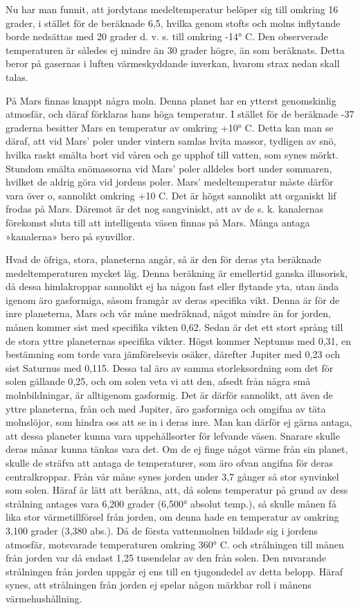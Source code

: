\documentclass[a4paper, 12pt, oneside, swedish]{article}
\begin{document}
Nu har man funnit, att jordytans medeltemperatur belöper sig till omkring 16 grader, i stället för de beräknade 6,5, hvilka genom stofts och molns inflytande borde nedsättas med 20 grader d. v. s. till omkring -14° C. Den observerade temperaturen är således ej mindre än 30 grader högre, än som beräknats. Detta beror på gasernas i luften värmeskyddande inverkan, hvarom strax nedan skall talas.

På Mars finnas knappt några moln. Denna planet har en ytterst genomskinlig atmosfär, och däraf förklaras hans höga temperatur. I stället för de beräknade -37 graderna besitter Mars en temperatur av omkring +10° C. Detta kan man se däraf, att vid Mars' poler under vintern samlas hvita massor, tydligen av snö, hvilka raskt smälta bort vid våren och ge upphof till vatten, som synes mörkt. Stundom smälta snömassorna vid Mars' poler alldeles bort under sommaren, hvilket de aldrig göra vid jordens poler. Mars' medeltemperatur måste därför vara över o, sannolikt omkring +10 C. Det är högst sannolikt att organiskt lif frodas på Mars. Däremot är det nog sangviniskt, att av de s. k. kanalernas förekomst sluta till att intelligenta väsen finnas på Mars. Många antaga »kanalerna» bero på synvillor.

Hvad de öfriga, stora, planeterna angår, så är den för deras yta beräknade medeltemperaturen mycket låg. Denna beräkning är emellertid ganska illusorisk, då dessa himlakroppar sannolikt ej ha någon fast eller flytande yta, utan ända igenom äro gasformiga, såsom framgår av deras specifika vikt. Denna är för de inre planeterna, Mars och vår måne medräknad, något mindre än for jorden, månen kommer sist med specifika vikten 0,62. Sedan är det ett stort språng till de stora yttre planeternas specifika vikter. Högst kommer Neptunus med 0,31, en bestämning som torde vara jämförelsevis osäker, därefter Jupiter med 0,23 och sist Saturnus med 0,115. Dessa tal äro av samma storleksordning som det för solen gällande 0,25, och om solen veta vi att den, afsedt från några små molnbildningar, är alltigenom gasformig. Det är därför sannolikt, att även de yttre planeterna, från och med Jupiter, äro gasformiga och omgifna av täta molnslöjor, som hindra oss att se in i deras inre. Man kan därför ej gärna antaga, att dessa planeter kunna vara uppehållsorter för lefvande väsen. Snarare skulle deras månar kunna tänkas vara det. Om de ej finge något värme från sin planet, skulle de sträfva att antaga de temperaturer, som äro ofvan angifna för deras centralkroppar. Från vår måne synes jorden under 3,7 gånger så stor synvinkel som solen. Häraf är lätt att beräkna, att, då solens temperatur på grund av dess strålning antages vara 6,200 grader (6,500° absolut temp.), så skulle månen få lika stor värmetillförsel från jorden, om denna hade en temperatur av omkring 3,100 grader (3,380 abs.). Då de första vattenmolnen bildade sig i jordens atmosfär, motsvarade temperaturen omkring 360° C. och strålningen till månen från jorden var då endast 1,25 tusendelar av den från solen. Den nuvarande strålningen från jorden uppgår ej ens till en tjugondedel av detta belopp. Häraf synes, att strålningen från jorden ej spelar någon märkbar roll i månens värmehushållning.
\end{document}
